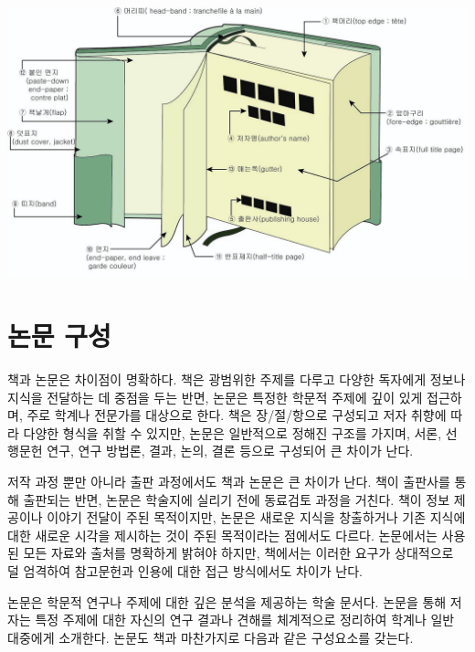 \documentclass[
  letterpaper,
]{book}
\begin{document}
\includegraphics{images/book_cover_inside.jpeg}

\hypertarget{uxb17cuxbb38-uxad6cuxc131}{%
\section{논문 구성}\label{uxb17cuxbb38-uxad6cuxc131}}

책과 논문은 차이점이 명확하다. 책은 광범위한 주제를 다루고 다양한
독자에게 정보나 지식을 전달하는 데 중점을 두는 반면, 논문은 특정한
학문적 주제에 깊이 있게 접근하며, 주로 학계나 전문가를 대상으로 한다.
책은 장/절/항으로 구성되고 저자 취향에 따라 다양한 형식을 취할 수
있지만, 논문은 일반적으로 정해진 구조를 가지며, 서론, 선행문헌 연구,
연구 방법론, 결과, 논의, 결론 등으로 구성되어 큰 차이가 난다.

저작 과정 뿐만 아니라 출판 과정에서도 책과 논문은 큰 차이가 난다. 책이
출판사를 통해 출판되는 반면, 논문은 학술지에 실리기 전에 동료검토 과정을
거친다. 책이 정보 제공이나 이야기 전달이 주된 목적이지만, 논문은 새로운
지식을 창출하거나 기존 지식에 대한 새로운 시각을 제시하는 것이 주된
목적이라는 점에서도 다르다. 논문에서는 사용된 모든 자료와 출처를
명확하게 밝혀야 하지만, 책에서는 이러한 요구가 상대적으로 덜 엄격하여
참고문헌과 인용에 대한 접근 방식에서도 차이가 난다.

논문은 학문적 연구나 주제에 대한 깊은 분석을 제공하는 학술 문서다.
논문을 통해 저자는 특정 주제에 대한 자신의 연구 결과나 견해를 체계적으로
정리하여 학계나 일반 대중에게 소개한다. 논문도 책과 마찬가지로 다음과
같은 구성요소를 갖는다.
\end{document}
